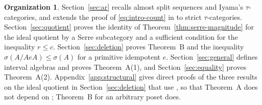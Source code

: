 \documentclass[a4paper,reqno,10pt]{amsart}
\theoremstyle{definition}
\newtheorem*{organization}{Organization}
\numberwithin{equation}{section}
\begin{document}
\begin{organization}
Section~\ref{sec:ar} recalls almost split sequences and Iyama's
\(\tau\)-categories, and extends the proof of \eqref{eq:intro-count} in
\cite{BHK} to strict \(\tau\)-categories. Section~\ref{sec:quotient} proves the
identity of Theorem~\ref{thm:serre-magnitude} for the ideal quotient by a
Serre subcategory and a
sufficient condition for the inequality \(r\leq c\). Section~\ref{sec:deletion} proves
Theorem~B and the inequality \(\sigma(A/AeA)\leq\sigma(A)\) for a primitive
idempotent \(e\). Section~\ref{sec:general} defines interval algebras
and proves Theorem~A(1), and Section~\ref{sec:equality} proves
Theorem~A(2).
Appendix~\ref{app:structural} gives direct proofs of the three results on
the ideal quotient in Section~\ref{sec:deletion} that use \cite{RV}, so that Theorem~A does
not depend on \cite{RV}; Theorem~B for an arbitrary poset does.
\end{organization}
\end{document}
